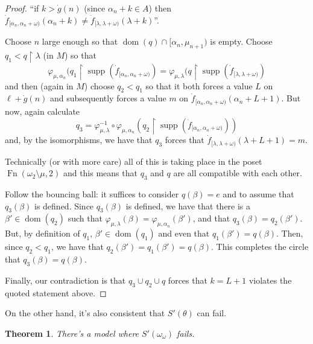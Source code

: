 \documentclass{amsart}
\theoremstyle{plain}
\newtheorem{theorem}{Theorem}
\theoremstyle{definition}
\theoremstyle{remark}
\theoremstyle{plain}
\theoremstyle{definition}
\theoremstyle{remark}
\begin{document}
\begin{proof}
        \centerline{
         ``if $k>\dot g(n)$ (since  $\alpha_n+k\in A$) then
         $\dot f_{[\alpha_n,\alpha_n+\omega)}(\alpha_n+k) \neq
        \dot f_{[\lambda,\lambda+\omega)}(\lambda +k)$''.}

        Choose $n$ large enough so that $\mathop{dom}(q) \cap [\alpha_n,
        \mu_{n+1})$ is
        empty.
         Choose $q_1<q\restriction \lambda$ (in $M$) so that
        $$ \varphi_{\mu,\alpha_n}(q_1\restriction \operatorname{supp}(
         \dot f_{[\alpha_n,\alpha_n+\omega)}) =
        \varphi_{\mu,\lambda}(q\restriction \operatorname{supp}(
         \dot f_{[\lambda,\lambda+\omega)}) $$
        and then (again in $M$) choose $q_2 < q_1$
        so that it both forces a value
         $L$ on $\ell+\dot g(n)$
        and subsequently forces a value $m$ on
         $\dot f_{[\alpha_n, \alpha_n+\omega)}(\alpha_n+L+1)$.
        But now, again calculate
        $$ q_3 = \varphi_{\mu,\lambda}^{-1} \circ \varphi_{\mu,\alpha_n}
        (q_2\restriction \operatorname{supp}(\dot
        f_{[\alpha_n,\alpha_n+\omega)}))$$
        and, by the isomorphisms, we have that $q_3$ forces that
         $\dot f_{[\lambda,\lambda+\omega)}(\lambda+L+1) = m$.

        Technically (or with more care)  all of this is taking place in the
        poset $\operatorname{Fn}(\omega_2\setminus \mu,2)$ and this means
        that $q_3$ and $q$ are all compatible with each other.


        Follow
        the bouncing ball: it suffices to consider
         $q(\beta)=e$ and to assume that $q_3(\beta)$ is defined.
        Since $q_3(\beta)$ is defined, we have that
        there is a  $\beta'\in\mathop{dom}(q_2)$ such that $
         \varphi_{\mu,\lambda}(\beta) = \varphi_{\mu,\alpha_n}(\beta')$,
        and that $q_3(\beta) = q_2(\beta')$.
        But, by definition of $q_1$, $\beta'\in\mathop{dom}(q_1)$
        and even  that $q_1(\beta') = q(\beta)$.
         Then, since $q_2<q_1$, we have that $q_2(\beta')=q_1(\beta') =
         q(\beta)$. This completes the circle that $q_3(\beta) = q(\beta)$.
        \bigskip

        Finally, our contradiction is that $q_3\cup q_2\cup q$
        forces that
         $k=L+1$ violates the quoted statement above.
        \end{proof}

  On the other hand, it's also consistent that \(S'(\theta)\) can fail.

  \begin{theorem}
    There's a model where \(S'(\omega_\omega)\)
    fails.
  \end{theorem}
\end{document}
